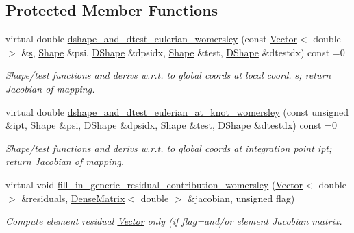 \subsection*{Protected Member Functions}
\begin{DoxyCompactItemize}
\item 
virtual double \hyperlink{classoomph_1_1WomersleyEquations_a26d31e02c3fb483c76402823e09d67c7}{dshape\+\_\+and\+\_\+dtest\+\_\+eulerian\+\_\+womersley} (const \hyperlink{classoomph_1_1Vector}{Vector}$<$ double $>$ \&\hyperlink{cfortran_8h_ab7123126e4885ef647dd9c6e3807a21c}{s}, \hyperlink{classoomph_1_1Shape}{Shape} \&psi, \hyperlink{classoomph_1_1DShape}{D\+Shape} \&dpsidx, \hyperlink{classoomph_1_1Shape}{Shape} \&test, \hyperlink{classoomph_1_1DShape}{D\+Shape} \&dtestdx) const =0
\begin{DoxyCompactList}\small\item\em Shape/test functions and derivs w.\+r.\+t. to global coords at local coord. s; return Jacobian of mapping. \end{DoxyCompactList}\item 
virtual double \hyperlink{classoomph_1_1WomersleyEquations_a5f8bd506dbebc304f30f86ef4acfbd9d}{dshape\+\_\+and\+\_\+dtest\+\_\+eulerian\+\_\+at\+\_\+knot\+\_\+womersley} (const unsigned \&ipt, \hyperlink{classoomph_1_1Shape}{Shape} \&psi, \hyperlink{classoomph_1_1DShape}{D\+Shape} \&dpsidx, \hyperlink{classoomph_1_1Shape}{Shape} \&test, \hyperlink{classoomph_1_1DShape}{D\+Shape} \&dtestdx) const =0
\begin{DoxyCompactList}\small\item\em Shape/test functions and derivs w.\+r.\+t. to global coords at integration point ipt; return Jacobian of mapping. \end{DoxyCompactList}\item 
virtual void \hyperlink{classoomph_1_1WomersleyEquations_a5aebac86c117c1cc99437d26686d000e}{fill\+\_\+in\+\_\+generic\+\_\+residual\+\_\+contribution\+\_\+womersley} (\hyperlink{classoomph_1_1Vector}{Vector}$<$ double $>$ \&residuals, \hyperlink{classoomph_1_1DenseMatrix}{Dense\+Matrix}$<$ double $>$ \&jacobian, unsigned flag)
\begin{DoxyCompactList}\small\item\em Compute element residual \hyperlink{classoomph_1_1Vector}{Vector} only (if flag=and/or element Jacobian matrix. \end{DoxyCompactList}\end{DoxyCompactItemize}
